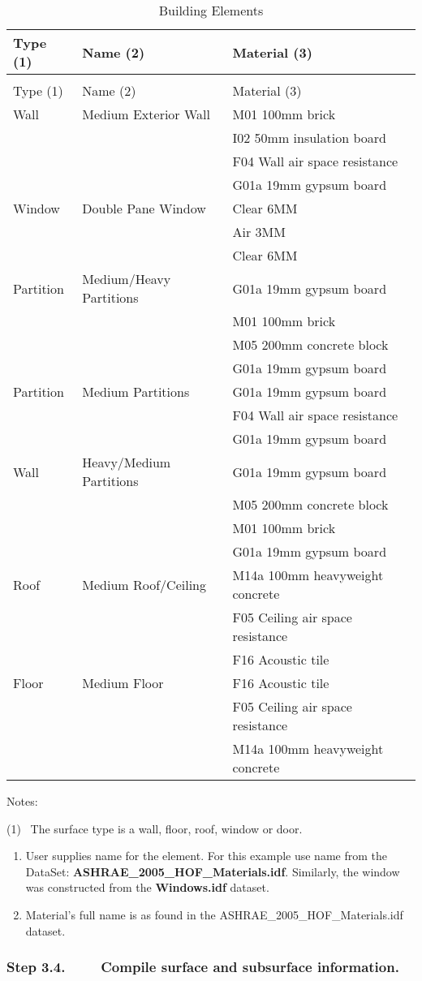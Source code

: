 \begin{longtable}[c]{@{}lll@{}}
\caption{Building Elements \label{table:building-elements}} \tabularnewline
\toprule 
Type (1) & Name (2) & Material (3) \tabularnewline
\midrule
\endfirsthead

\caption[]{Building Elements} \tabularnewline
\toprule 
Type (1) & Name (2) & Material (3) \tabularnewline
\midrule
\endhead

Wall & Medium Exterior Wall & M01 100mm brick \tabularnewline
~ & ~ & I02 50mm insulation board \tabularnewline
~ & ~ & F04 Wall air space resistance \tabularnewline
~ & ~ & G01a 19mm gypsum board \tabularnewline
Window & Double Pane Window & Clear 6MM \tabularnewline
~ & ~ & Air 3MM \tabularnewline
~ & ~ & Clear 6MM \tabularnewline
Partition & Medium/Heavy Partitions & G01a 19mm gypsum board \tabularnewline
~ & ~ & M01 100mm brick \tabularnewline
~ & ~ & M05 200mm concrete block \tabularnewline
~ & ~ & G01a 19mm gypsum board \tabularnewline
Partition & Medium Partitions & G01a 19mm gypsum board \tabularnewline
~ & ~ & F04 Wall air space resistance \tabularnewline
~ & ~ & G01a 19mm gypsum board \tabularnewline
Wall & Heavy/Medium Partitions & G01a 19mm gypsum board \tabularnewline
~ & ~ & M05 200mm concrete block \tabularnewline
~ & ~ & M01 100mm brick \tabularnewline
~ & ~ & G01a 19mm gypsum board \tabularnewline
Roof & Medium Roof/Ceiling & M14a 100mm heavyweight concrete \tabularnewline
~ & ~ & F05 Ceiling air space resistance \tabularnewline
~ & ~ & F16 Acoustic tile \tabularnewline
Floor & Medium Floor & F16 Acoustic tile \tabularnewline
~ & ~ & F05 Ceiling air space resistance \tabularnewline
~ & ~ & M14a 100mm heavyweight concrete \tabularnewline
\bottomrule
\end{longtable}

Notes:

(1)~ The surface type is a wall, floor, roof, window or door.

\begin{enumerate}
\def\labelenumi{(\arabic{enumi})}
\setcounter{enumi}{1}
\item
  User supplies name for the element. For this example use name from the DataSet: \textbf{ASHRAE\_2005\_HOF\_Materials.idf}. Similarly, the window was constructed from the \textbf{Windows.idf} dataset.
\item
  Material's full name is as found in the ASHRAE\_2005\_HOF\_Materials.idf dataset.
\end{enumerate}

\subsubsection{Step 3.4.~~~~ Compile surface and subsurface information.}\label{step-3.4.-compile-surface-and-subsurface-information.}

